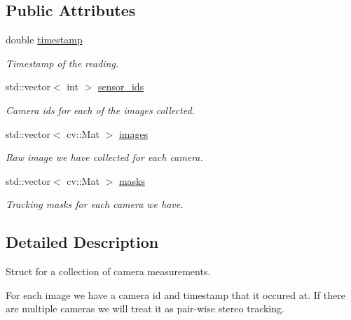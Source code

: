 \subsection*{Public Attributes}
\begin{DoxyCompactItemize}
\item 
\mbox{\label{structov__core_1_1CameraData_a45a72238c04abfdba1157d5cb0d797ad}} 
double \hyperlink{structov__core_1_1CameraData_a45a72238c04abfdba1157d5cb0d797ad}{timestamp}
\begin{DoxyCompactList}\small\item\em Timestamp of the reading. \end{DoxyCompactList}\item 
\mbox{\label{structov__core_1_1CameraData_a3ca97cd845766a368f65d771563908a5}} 
std\+::vector$<$ int $>$ \hyperlink{structov__core_1_1CameraData_a3ca97cd845766a368f65d771563908a5}{sensor\+\_\+ids}
\begin{DoxyCompactList}\small\item\em Camera ids for each of the images collected. \end{DoxyCompactList}\item 
\mbox{\label{structov__core_1_1CameraData_aeb70773b73cb3908b60f4619c28bbbdb}} 
std\+::vector$<$ cv\+::\+Mat $>$ \hyperlink{structov__core_1_1CameraData_aeb70773b73cb3908b60f4619c28bbbdb}{images}
\begin{DoxyCompactList}\small\item\em Raw image we have collected for each camera. \end{DoxyCompactList}\item 
\mbox{\label{structov__core_1_1CameraData_aa6b398defbcc6f8eebf1881bc71bf852}} 
std\+::vector$<$ cv\+::\+Mat $>$ \hyperlink{structov__core_1_1CameraData_aa6b398defbcc6f8eebf1881bc71bf852}{masks}
\begin{DoxyCompactList}\small\item\em Tracking masks for each camera we have. \end{DoxyCompactList}\end{DoxyCompactItemize}


\subsection{Detailed Description}
Struct for a collection of camera measurements. 

For each image we have a camera id and timestamp that it occured at. If there are multiple cameras we will treat it as pair-\/wise stereo tracking. 